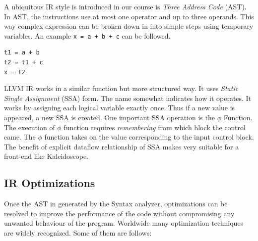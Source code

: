 \documentclass[acmlarge, nonacm]{acmart}
\begin{document}
A ubiquitous IR style is introduced in our course is \textit{Three Address Code} (AST). In AST, the instructions use at most one operator and up to three operands. This way complex expression can be broken down in into simple steps using temporary variables. An example \verb|x = a + b + c| can be followed.

\begin{lstlisting}
t1 = a + b
t2 = t1 + c
x = t2
\end{lstlisting}

LLVM IR works in a similar function but more structured way. It uses \textit{Static Single Assignment} (SSA) form. The name somewhat indicates how it operates. It works by assigning each logical variable exactly once. Thus if a new value is appeared, a new SSA is created. One important SSA operation is the $\phi$ Function. The execution of $\phi$ function requires \textit{remembering} from which block the control came. The $\phi$ function takes on the value corresponding to the input control block. The benefit of explicit dataflow relationship of SSA makes very suitable for a front-end like Kaleidoscope.

\subsection{IR Optimizations}
Once the AST in generated by the Syntax analyzer, optimizations can be resolved to improve the performance of the code without compromising any unwanted behaviour of the program. Worldwide many optimization techniques are widely recognized. Some of them are follows:
\end{document}

